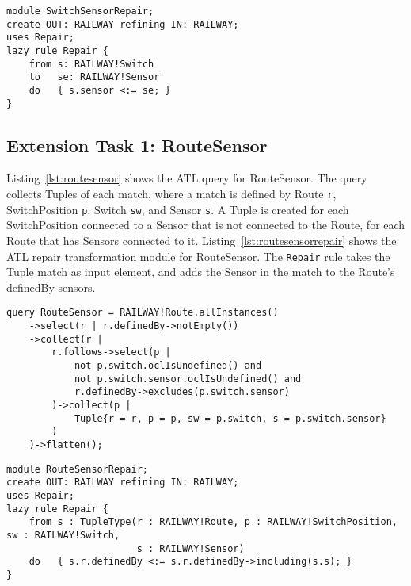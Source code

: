 \documentclass[submission,copyright,creativecommons]{eptcs}
\begin{document}
\lstset{language=atl}
\begin{lstlisting}[float=htb, caption={SwitchSensor repair transformation module in ATL}, label=lst:switchsensorrepair, captionpos=b, frame=tb, belowskip=-10pt]
module SwitchSensorRepair;
create OUT: RAILWAY refining IN: RAILWAY;
uses Repair;
lazy rule Repair {
	from s: RAILWAY!Switch
	to   se: RAILWAY!Sensor
	do	 { s.sensor <:= se; }
}
\end{lstlisting}

\subsection{Extension Task 1: RouteSensor}

Listing~\ref{lst:routesensor} shows the ATL query for RouteSensor. The query collects Tuples of each match, where a match is defined by Route \texttt{r}, SwitchPosition \texttt{p}, Switch \texttt{sw}, and Sensor \texttt{s}. A Tuple is created for each SwitchPosition connected to a Sensor that is not connected to the Route, for each Route that has Sensors connected to it. Listing~\ref{lst:routesensorrepair} shows the ATL repair transformation module for RouteSensor. The \texttt{Repair} rule takes the Tuple match as input element, and adds the Sensor in the match to the Route's definedBy sensors.


\lstset{language=atl}
\begin{lstlisting}[float=htb, caption={RouteSensor query in ATL}, label=lst:routesensor, captionpos=b, frame=tb, belowskip=-10pt]
query RouteSensor = RAILWAY!Route.allInstances()
	->select(r | r.definedBy->notEmpty())
	->collect(r |
		r.follows->select(p | 
			not p.switch.oclIsUndefined() and 
			not p.switch.sensor.oclIsUndefined() and
			r.definedBy->excludes(p.switch.sensor)
		)->collect(p | 
			Tuple{r = r, p = p, sw = p.switch, s = p.switch.sensor}
		)
	)->flatten();
\end{lstlisting}

\lstset{language=atl}
\begin{lstlisting}[float=htb, caption={RouteSensor repair transformation module in ATL}, label=lst:routesensorrepair, captionpos=b, frame=tb, belowskip=-10pt]
module RouteSensorRepair;
create OUT: RAILWAY refining IN: RAILWAY;
uses Repair;
lazy rule Repair {
	from s : TupleType(r : RAILWAY!Route, p : RAILWAY!SwitchPosition, sw : RAILWAY!Switch,
	                   s : RAILWAY!Sensor)
	do   { s.r.definedBy <:= s.r.definedBy->including(s.s);	}
}
\end{lstlisting}
\end{document}
